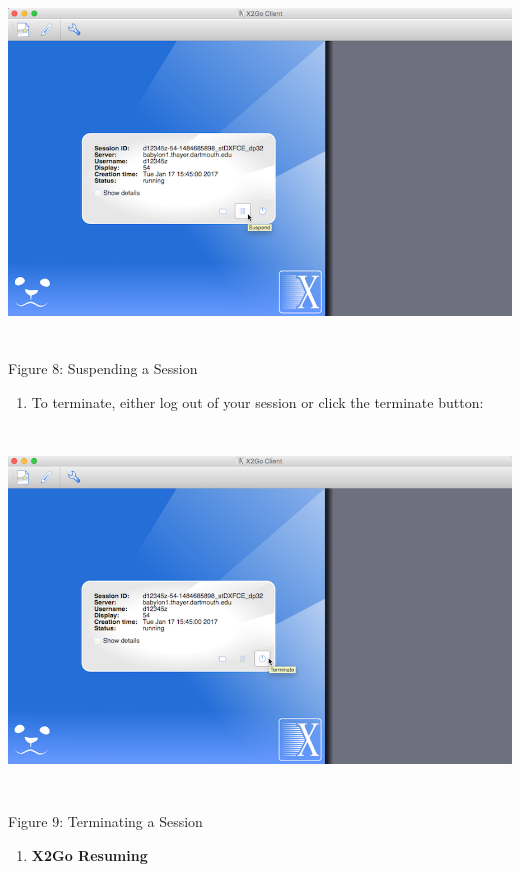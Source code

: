 \documentclass[
]{article}
\begin{document}
\includegraphics[width=6.08268in,height=3.71654in]{images/media/image8.png}

Figure 8: Suspending a Session

\begin{enumerate}
\def\labelenumi{\arabic{enumi}.}
\setcounter{enumi}{13}
\item
  To terminate, either log out of your session or click the terminate
  button:
\end{enumerate}

\includegraphics[width=6.26806in,height=3.82311in]{images/media/image9.png}

Figure 9: Terminating a Session

\begin{enumerate}
\def\labelenumi{\Alph{enumi}.}
\setcounter{enumi}{4}
\item
  \textbf{X2Go Resuming}
\end{enumerate}
\end{document}
